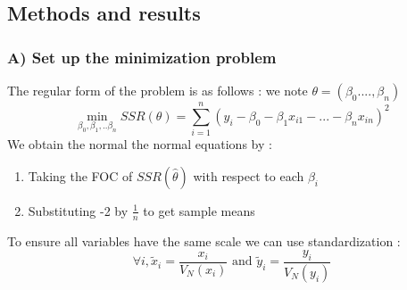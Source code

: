 \documentclass{article}
\begin{document}
\subsection{Methods and results}

\subsubsection{A) Set up  the minimization problem}
The regular form of the problem is as follows : we note $\theta = (\beta_0....,\beta_n)$
\begin{equation}
    \min_{\beta_0,\beta_1,..\beta_n} SSR(\theta) = \sum_{i=1}^n  (y_i -\beta_0 -\beta_1x_{i1} -...-\beta_nx_{in})^2
\end{equation}
We obtain the normal the normal equations by :
\begin{enumerate}
    \item Taking the FOC of $SSR(\hat{\theta})$ with respect to each $\beta_i$
    \item Substituting -2 by $\frac{1}{n}$ to get sample means
\end{enumerate}
To ensure all variables have the same scale we can use standardization : 
\begin{equation}
    \forall i, \tilde{x}_i = \frac{x_i}{V_N(x_i)} \text{ and } \tilde{y}_i = \frac{y_i}{V_N(y_i)}
\end{equation}
\end{document}
